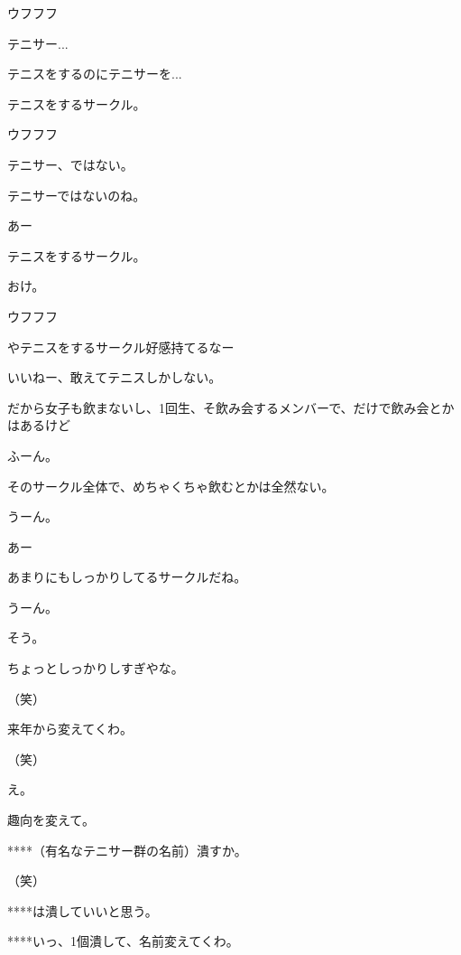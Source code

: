 \begin{multicols}{3}
{        ウフフフ

        テニサー...

        テニスをするのにテニサーを...

        テニスをするサークル。

        ウフフフ

        テニサー、ではない。

        テニサーではないのね。

        あー

        テニスをするサークル。

        おけ。

        ウフフフ

        やテニスをするサークル好感持てるなー

        いいねー、敢えてテニスしかしない。

        だから女子も飲まないし、1回生、そ飲み会するメンバーで、だけで飲み会とかはあるけど

        ふーん。

        そのサークル全体で、めちゃくちゃ飲むとかは全然ない。

        うーん。

        あー

        あまりにもしっかりしてるサークルだね。

        うーん。

        そう。

        ちょっとしっかりしすぎやな。

        （笑）

        来年から変えてくわ。

        （笑）

        え。

        趣向を変えて。

        ****（有名なテニサー群の名前）潰すか。

        （笑）

        ****は潰していいと思う。

        ****いっ、1個潰して、名前変えてくわ。

}
\end{multicols}
